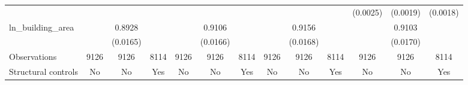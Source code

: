 {\begin{tabular}{l*{12}{c}}
                &                  &                  &                  &                  &                  &                  &                  &                  &                  & (0.0025)         & (0.0019)         & (0.0018)         \\
\addlinespace
ln\_building\_area&                  &   0.8928\sym{***}&                  &                  &   0.9106\sym{***}&                  &                  &   0.9156\sym{***}&                  &                  &   0.9103\sym{***}&                  \\
                &                  & (0.0165)         &                  &                  & (0.0166)         &                  &                  & (0.0168)         &                  &                  & (0.0170)         &                  \\
\midrule
Observations    &     9126         &     9126         &     8114         &     9126         &     9126         &     8114         &     9126         &     9126         &     8114         &     9126         &     9126         &     8114         \\
Structural controls&       No         &       No         &      Yes         &       No         &       No         &      Yes         &       No         &       No         &      Yes         &       No         &       No         &      Yes         \\
\bottomrule
\end{tabular}
}
